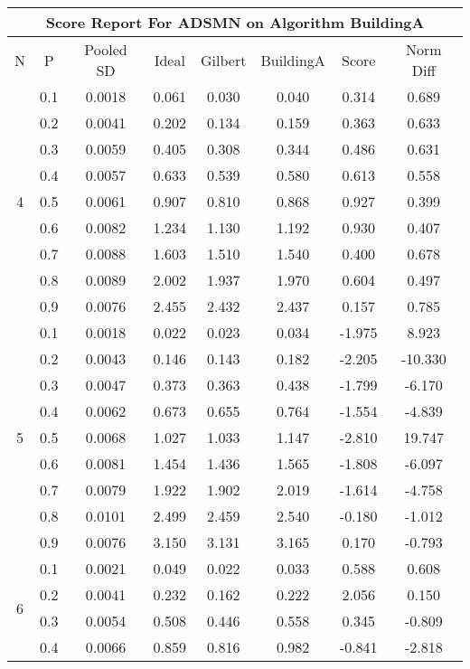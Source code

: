 \documentclass[11pt,a4paper]{report}
\begin{document}
\begin{longtable}{ | c | c || c | c | c | c | c | c | }
\hline
\multicolumn{8}{|c|}{ Score Report For ADSMN on Algorithm BuildingA} \\
\hline
N & P & Pooled SD &  Ideal &  Gilbert & BuildingA  & Score & Norm Diff \\
 \hline
 \hline
 \endhead
\multirow{9}{*}{4} & 0.1 & 0.0018 & 0.061 & 0.030 & 0.040 & 0.314 & 0.689 \\
 & 0.2 & 0.0041 & 0.202 & 0.134 & 0.159 & 0.363 & 0.633 \\
 & 0.3 & 0.0059 & 0.405 & 0.308 & 0.344 & 0.486 & 0.631 \\
 & 0.4 & 0.0057 & 0.633 & 0.539 & 0.580 & 0.613 & 0.558 \\
 & 0.5 & 0.0061 & 0.907 & 0.810 & 0.868 & 0.927 & 0.399 \\
 & 0.6 & 0.0082 & 1.234 & 1.130 & 1.192 & 0.930 & 0.407 \\
 & 0.7 & 0.0088 & 1.603 & 1.510 & 1.540 & 0.400 & 0.678 \\
 & 0.8 & 0.0089 & 2.002 & 1.937 & 1.970 & 0.604 & 0.497 \\
 & 0.9 & 0.0076 & 2.455 & 2.432 & 2.437 & 0.157 & 0.785 \\
 \hline
\multirow{9}{*}{5} & 0.1 & 0.0018 & 0.022 & 0.023 & 0.034 & -1.975 & 8.923 \\
 & 0.2 & 0.0043 & 0.146 & 0.143 & 0.182 & -2.205 & -10.330 \\
 & 0.3 & 0.0047 & 0.373 & 0.363 & 0.438 & -1.799 & -6.170 \\
 & 0.4 & 0.0062 & 0.673 & 0.655 & 0.764 & -1.554 & -4.839 \\
 & 0.5 & 0.0068 & 1.027 & 1.033 & 1.147 & -2.810 & 19.747 \\
 & 0.6 & 0.0081 & 1.454 & 1.436 & 1.565 & -1.808 & -6.097 \\
 & 0.7 & 0.0079 & 1.922 & 1.902 & 2.019 & -1.614 & -4.758 \\
 & 0.8 & 0.0101 & 2.499 & 2.459 & 2.540 & -0.180 & -1.012 \\
 & 0.9 & 0.0076 & 3.150 & 3.131 & 3.165 & 0.170 & -0.793 \\
 \hline
\multirow{9}{*}{6} & 0.1 & 0.0021 & 0.049 & 0.022 & 0.033 & 0.588 & 0.608 \\
 & 0.2 & 0.0041 & 0.232 & 0.162 & 0.222 & 2.056 & 0.150 \\
 & 0.3 & 0.0054 & 0.508 & 0.446 & 0.558 & 0.345 & -0.809 \\
 & 0.4 & 0.0066 & 0.859 & 0.816 & 0.982 & -0.841 & -2.818 \\

\end{longtable}
\end{document}
